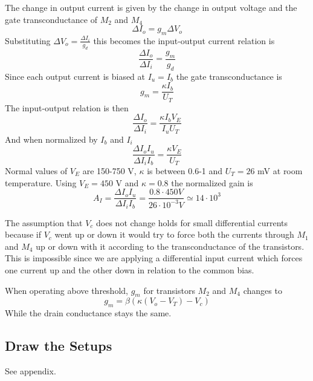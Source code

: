 The change in output current is given by the change in output voltage and the gate transconductance of \(M_2\) and \(M_4\)
\begin{equation*}
    \Delta I_o = g_m\Delta V_o
\end{equation*}
Substituting \(\Delta V_o = \frac{\Delta I_i}{g_d}\) this becomes the input-output current relation is
\begin{equation*}
    \frac{\Delta I_{o}}{\Delta I_i} = \frac{g_m}{g_d}
\end{equation*}
Since each output current is biased at \(I_u=I_b\) the gate transconductance is
\begin{equation*}
    g_m = \frac{\kappa I_b}{U_T}
\end{equation*}
The input-output relation is then
\begin{equation*}
    \frac{\Delta I_o}{\Delta I_i} = \frac{\kappa I_b V_E}{I_u U_T}
\end{equation*}
And when normalized by \(I_b\) and \(I_i\)
\begin{equation*}
    \frac{\Delta I_o I_u}{\Delta I_i I_b} = \frac{\kappa V_E}{U_T}
\end{equation*}
Normal values of \(V_E\) are 150-750 V, \(\kappa\) is between 0.6-1 and \(U_T=26\) mV at room temperature. Using
\(V_E=450\) V and \(\kappa=0.8\) the normalized gain is
\begin{equation*}
    A_I = \frac{\Delta I_o I_u}{\Delta I_i I_b} = \frac{0.8\cdot450 V}{26\cdot 10^{-3} V} \simeq 14\cdot10^{3}
\end{equation*}

The assumption that \(V_c\) does not change holds for small differential currents because if \(V_c\) went up or down it would
try to force both the currents through \(M_1\) and \(M_4\) up or down with it according to the transconductance of the transistors.
This is impossible since we are applying a differential input current which forces one current up and the other down in relation 
to the common bias.

When operating above threshold, \(g_m\) for transistors \(M_2\) and \(M_4\) changes to 
\begin{equation*}
    g_m = \beta\left(\kappa\left(V_o-V_T\right)-V_c\right)
\end{equation*}
While the drain conductance stays the same.

\subsection{Draw the Setups}
See appendix.

